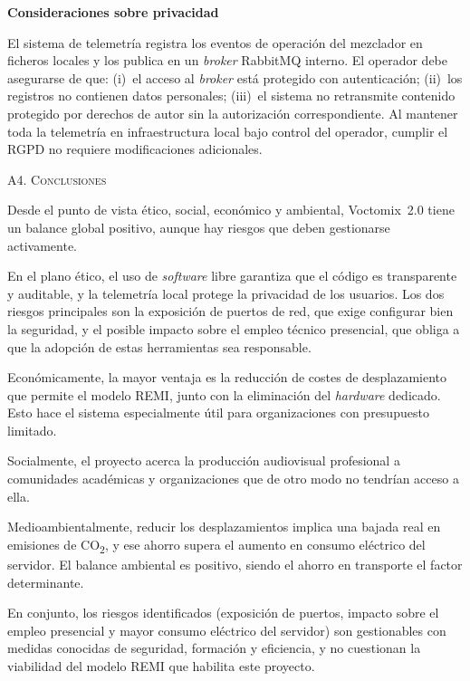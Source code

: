 \vspace{0.15cm}
\textbf{Consideraciones sobre privacidad}

El sistema de telemetría registra los eventos de operación del mezclador en ficheros locales y
los publica en un \textit{broker} RabbitMQ interno. El operador debe asegurarse de que: (i)~el acceso al
\textit{broker} está protegido con autenticación; (ii)~los registros no contienen datos personales;
(iii)~el sistema no retransmite contenido protegido por derechos de autor sin la autorización
correspondiente. Al mantener toda la telemetría en infraestructura local bajo control del
operador, cumplir el \acs{RGPD} no requiere modificaciones adicionales.
\vspace{0.3cm}

\Large{\textsc{\textcolor{nar}{A4. Conclusiones}}}
\vspace{0.2cm}

\normalsize{Desde el punto de vista ético, social, económico y ambiental, Voctomix~2.0 tiene un
balance global positivo, aunque hay riesgos que deben gestionarse activamente.

En el plano ético, el uso de \textit{software} libre garantiza que el código es transparente y auditable,
y la telemetría local protege la privacidad de los usuarios. Los dos riesgos principales son la
exposición de puertos de red, que exige configurar bien la seguridad, y el posible impacto sobre
el empleo técnico presencial, que obliga a que la adopción de estas herramientas sea responsable.

Económicamente, la mayor ventaja es la reducción de costes de desplazamiento que permite el
modelo REMI, junto con la eliminación del \textit{hardware} dedicado. Esto hace el sistema especialmente
útil para organizaciones con presupuesto limitado.

Socialmente, el proyecto acerca la producción audiovisual profesional a comunidades académicas y
organizaciones que de otro modo no tendrían acceso a ella.

Medioambientalmente, reducir los desplazamientos implica una bajada real en emisiones de
CO\textsubscript{2}, y ese ahorro supera el aumento en consumo eléctrico del servidor. El balance
ambiental es positivo, siendo el ahorro en transporte el factor determinante.

En conjunto, los riesgos identificados (exposición de puertos, impacto sobre el empleo presencial y
mayor consumo eléctrico del servidor) son gestionables con medidas conocidas de seguridad,
formación y eficiencia, y no cuestionan la viabilidad del modelo REMI que habilita este proyecto.}

